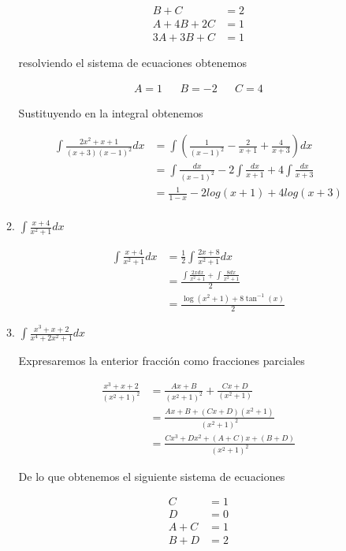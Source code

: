 \documentclass[letterpaper]{article}
\theoremstyle{definition}
\theoremstyle{lemathm}
\theoremstyle{lemademthm}
\begin{document}
\begin{enumerate}
\begin{enumerate}
			\begin{align*}
				B + C &= 2\\
				A + 4B + 2C &= 1\\
				3A + 3B + C &= 1
			\end{align*}

			resolviendo el sistema de ecuaciones obtenemos

			\begin{align*}
				A = 1 && B = -2 && C = 4
			\end{align*}

			Sustituyendo en la integral obtenemos

			\begin{align*}
				\int \frac{2x^2+x+1}{(x+3)(x-1)^2} dx &= \int \left(\frac{1}{(x-1)^2} - \frac{2}{x+1} + \frac{4}{x+3}\right)dx\\
				&= \int \frac{dx}{(x-1)^2} - 2\int\frac{dx}{x+1} + 4\int\frac{dx}{x+3}\\
				&= \frac{1}{1-x} - 2log(x+1) + 4log(x+3)\\
			\end{align*}

            \item $\int \frac{x+4}{x^2+1} dx$
			
			\begin{align*}
				\int \frac{x+4}{x^2+1} dx &= \frac{1}{2} \int \frac{2x+8}{x^2+1}dx\\
				&= \frac{\int \frac{2xdx}{x^2+1} + \int \frac{8dx}{x^2+1}}{2}\\
				&= \frac{\log(x^2+1) + 8\tan^{-1}(x)}{2}
			\end{align*}

            \item $\int \frac{x^3+x+2}{x^4+2x^2+1}dx$
			
			Expresaremos la enterior fracción como fracciones parciales

			\begin{align*}
				\frac{x^3+x+2}{(x^2+1)^2} &= \frac{Ax+B}{(x^2+1)^2}+\frac{Cx+D}{(x^2+1)}\\
				&= \frac{Ax+B + (Cx + D)(x^2+1)}{(x^2+1)^2}\\
				&= \frac{Cx^3 + Dx^2 + (A+C)x + (B + D)}{(x^2+1)^2}
			\end{align*}

			De lo que obtenemos el siguiente sistema de ecuaciones

			\begin{align*}
				C &= 1\\
				D &= 0\\
				A + C &= 1\\
				B + D &= 2
			\end{align*}


\end{enumerate}
\end{enumerate}
\end{document}

